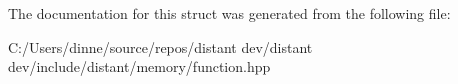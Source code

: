 The documentation for this struct was generated from the following file\+:\begin{DoxyCompactItemize}
\item 
C\+:/\+Users/dinne/source/repos/distant dev/distant dev/include/distant/memory/function.\+hpp\end{DoxyCompactItemize}
